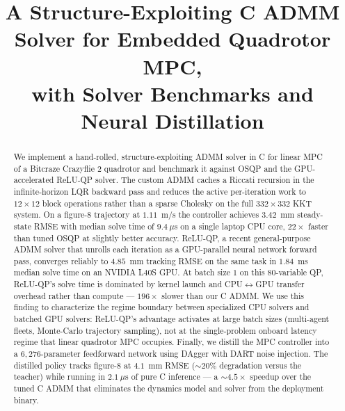 \documentclass[conference]{IEEEtran}
\begin{document}
\title{A Structure-Exploiting C ADMM Solver for Embedded Quadrotor MPC,\\
with Solver Benchmarks and Neural Distillation}

\author{
}

\maketitle

\begin{abstract}
We implement a hand-rolled, structure-exploiting ADMM solver in C for linear MPC of a Bitcraze Crazyflie 2 quadrotor and benchmark it against OSQP and the GPU-accelerated ReLU-QP solver. The custom ADMM caches a Riccati recursion in the infinite-horizon LQR backward pass and reduces the active per-iteration work to $12\!\times\!12$ block operations rather than a sparse Cholesky on the full $332\!\times\!332$ KKT system. On a figure-8 trajectory at $1.11$~m/s the controller achieves $3.42$~mm steady-state RMSE with median solve time of $9.4~\mu$s on a single laptop CPU core, $22\times$ faster than tuned OSQP at slightly better accuracy. ReLU-QP, a recent general-purpose ADMM solver that unrolls each iteration as a GPU-parallel neural network forward pass, converges reliably to $4.85$~mm tracking RMSE on the same task in $1.84$~ms median solve time on an NVIDIA L40S GPU. At batch size $1$ on this $80$-variable QP, ReLU-QP's solve time is dominated by kernel launch and CPU$\leftrightarrow$GPU transfer overhead rather than compute --- $196\times$ slower than our C ADMM. We use this finding to characterize the regime boundary between specialized CPU solvers and batched GPU solvers: ReLU-QP's advantage activates at large batch sizes (multi-agent fleets, Monte-Carlo trajectory sampling), not at the single-problem onboard latency regime that linear quadrotor MPC occupies. Finally, we distill the MPC controller into a $6{,}276$-parameter feedforward network using DAgger with DART noise injection. The distilled policy tracks figure-8 at $4.1$~mm RMSE ($\sim 20\%$ degradation versus the teacher) while running in $2.1~\mu$s of pure C inference --- a $\sim 4.5\times$ speedup over the tuned C ADMM that eliminates the dynamics model and solver from the deployment binary.
\end{abstract}
\end{document}
